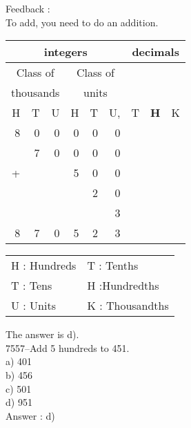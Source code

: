 \documentclass[letterpaper, 12pt]{article}
\begin{document}
Feedback :\\
To add, you need to do an addition.
\begin{center}
\begin{tabular}{|rrr|rrr|rrr|}
\hline
\multicolumn{6}{|c|}{integers} &\multicolumn{3}{|c|}{decimals} \\
\hline
\multicolumn{3}{|c|}{Class of} &\multicolumn{3}{|c|}{Class of} &  \multicolumn{3}{c|}{} \\
\multicolumn{3}{|c|}{thousands} &\multicolumn{3}{|c|}{units} &  \multicolumn{3}{c|}{} \\
\hline
H & T & U &H & T & U, & T\up{th} & \textbf{H\up{th}} & K\up{th} \\
\hline
\hline
8 & 0 & 0 & 0 & 0 & 0 &  & &\\
 & 7 & 0 & 0 & 0 & 0 &  & &\\
+ &  &  & 5 & 0 & 0 &  & &\\
 &  &  &  & 2 & 0 &  & &\\
 &  &  &  &  & 3 &  & &\\
\hline
\hline
 8 & 7 & 0 & 5 & 2 & 3 &  & &
\\
\hline
\end{tabular}
\end{center}

\scriptsize
\begin{center}
\begin{tabular}{ll}
H : Hundreds & T\up{th} : Tenths\\
T : Tens & H\up{th} :Hundredths\\
U : Units & K\up{e} : Thousandths\\
\end{tabular}
\end{center}

\normalsize
The answer is d).\\




7557--Add 5 hundreds to  451.\\

a) 401\\
b) 456\\
c) 501\\
d) 951\\

Answer : d)\\
\end{document}
